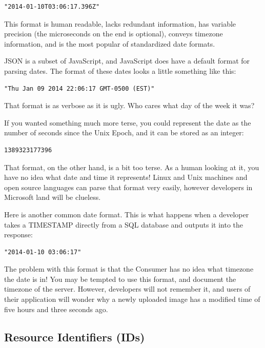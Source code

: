 \documentclass{book}
\begin{document}
\begin{verbatim}
"2014-01-10T03:06:17.396Z"
\end{verbatim}

This format is human readable, lacks redundant information, has variable precision (the microseconds on the end is optional), conveys timezone information, and is the most popular of standardized date formats.

JSON is a subset of JavaScript, and JavaScript does have a default format for parsing dates. The format of these dates looks a little something like this:

\begin{verbatim}
"Thu Jan 09 2014 22:06:17 GMT-0500 (EST)"
\end{verbatim}

That format is as verbose as it is ugly. Who cares what day of the week it was?

If you wanted something much more terse, you could represent the date as the number of seconds since the Unix Epoch, and it can be stored as an integer:

\begin{verbatim}
1389323177396
\end{verbatim}

That format, on the other hand, is a bit too terse. As a human looking at it, you have no idea what date and time it represents! Linux and Unix machines and open source languages can parse that format very easily, however developers in Microsoft land will be clueless.

Here is another common date format. This is what happens when a developer takes a TIMESTAMP directly from a SQL database and outputs it into the response:

\begin{verbatim}
"2014-01-10 03:06:17"
\end{verbatim}

The problem with this format is that the Consumer has no idea what timezone the date is in! You may be tempted to use this format, and document the timezone of the server. However, developers will not remember it, and users of their application will wonder why a newly uploaded image has a modified time of five hours and three seconds ago.

\subsection{Resource Identifiers (IDs)}
\end{document}
